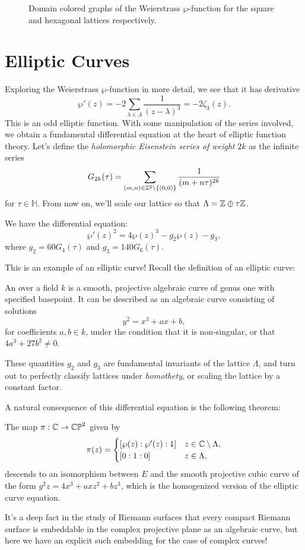 \documentclass{lkx_paper}
\begin{document}
\begin{figure}[ht]
	\caption{Domain colored graphs of the Weierstrass $\wp$-function for the square and hexagonal lattices respectively.}
\end{figure}

\section{Elliptic Curves}
Exploring the Weierstrass $\wp$-function in more detail, we see that it has derivative
\[
	\wp'(z) = -2\sum_{\lambda\in \Lambda} \frac{1}{(z-\lambda)^3} = -2\zeta_3(z).
\]
This is an odd elliptic function. With some manipulation of the series involved, we obtain a fundamental differential equation at the heart of elliptic function theory.
Let's define the \emph{holomorphic Eisenstein series of weight }$2k$ as the infinite series
\[
	G_{2k}(\tau) = \sum_{(m,n)\in \mathbb{Z}^2\setminus \{(0,0)\}}\frac{1}{(m+n\tau)^{2k}}
\]
for $\tau \in \mathbb{H}$. From now on, we'll scale our lattice so that $\Lambda = \mathbb{Z}\oplus \tau\mathbb{Z}$.
\begin{theorem}
	We have the differential equation:
	\[
		\wp'(z)^2 = 4\wp(z)^3 - g_2 \wp(z) -g_3,
	\]
	where $g_2 = 60 G_4(\tau)$ and $g_3=140 G_6(\tau)$.
\end{theorem}

This is an example of an elliptic curve! Recall the definition of an elliptic curve:

\begin{definition}
	An  over a field $k$ is a smooth, projective algebraic curve of genus one with specified basepoint. It can be described as an algebraic curve consisting of solutions
	\[
		y^2 = x^3+ax+b,
	\]
	for coefficients $a,b\in k$, under the condition that it is non-singular, or that $4a^3+27b^2\neq 0$.
\end{definition}

These quantities $g_2$ and $g_3$ are fundamental invariants of the lattice $\Lambda$, and turn out to perfectly classify lattices under \emph{homothety}, or scaling the lattice by a constant factor.

A natural consequence of this differential equation is the following theorem:
\begin{theorem}
	The map $\pi : \mathbb{C} \to \mathbb{CP}^2$ given by
	\[
		\pi(z) = \begin{cases}
			[\wp(z) : \wp'(z) : 1] & z\in \mathbb{C}\setminus\Lambda , \\
			[0 : 1 : 0]            & z \in \Lambda,
		\end{cases}
	\]
	descends to an isomorphism between $E$ and the smooth projective cubic curve of the form $y^2z=4x^3+axz^2+bz^3$, which is the homogenized version of the elliptic curve equation.
\end{theorem}
It's a deep fact in the study of Riemann surfaces that every compact Riemann surface is embeddable in the complex projective plane as an algebraic curve, but here we have an explicit such embedding for the case of complex curves!
\end{document}
